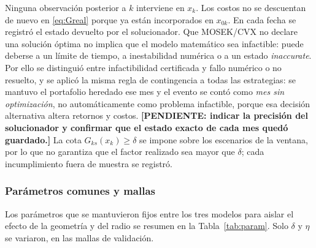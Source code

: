 Ninguna observación posterior a $k$ interviene en $x_k$. Los costos no se descuentan de nuevo en \eqref{eq:Greal} porque ya están incorporados en $x_{0k}$. 
En cada fecha se registró el estado devuelto por el solucionador. Que MOSEK/CVX no declare una solución óptima no implica que el modelo matemático sea infactible: puede deberse a un límite de tiempo, a inestabilidad numérica o a un estado \emph{inaccurate}. Por ello se distinguió entre infactibilidad certificada y fallo numérico o no resuelto, y se aplicó la misma regla de contingencia a todas las estrategias: se mantuvo el portafolio heredado ese mes y el evento se contó como \emph{mes sin optimización}, no automáticamente como problema infactible, porque esa decisión alternativa altera retornos y costos. \textbf{[PENDIENTE: indicar la precisión del solucionador y confirmar que el estado exacto de cada mes quedó guardado.]}
 La cota $G_{ks}(x_k)\ge\delta$ se impone sobre los escenarios de la ventana, por lo que no garantiza que el factor realizado sea mayor que $\delta$; cada incumplimiento fuera de muestra se registró.

\subsubsection{Parámetros comunes y mallas}

Los parámetros que se mantuvieron fijos entre los tres modelos para aislar el efecto de la geometría y del radio se resumen en la Tabla~\ref{tab:param}. Solo $\delta$ y $\eta$ se variaron, en las mallas de validación.

